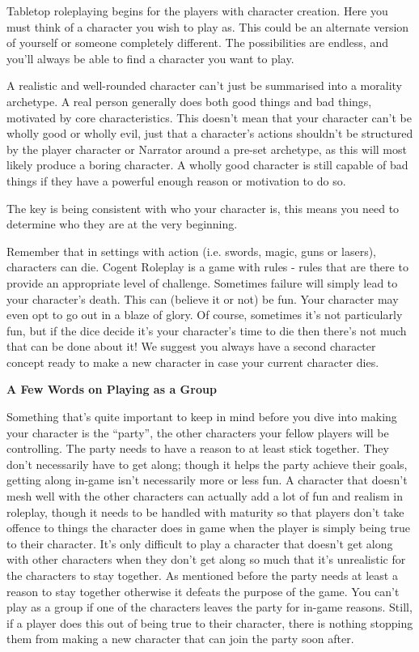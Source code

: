 Tabletop roleplaying begins for the players with character creation. Here you must think of a character you wish to play as. This could be an alternate version of yourself or someone completely different. The possibilities are endless, and you'll always be able to find a character you want to play.

A realistic and well-rounded character can't just be summarised into a morality archetype. A real person generally does both good things and bad things, motivated by core characteristics. This doesn't mean that your character can't be wholly good or wholly evil, just that a character's actions shouldn't be structured by the player character or Narrator around a pre-set archetype, as this will most likely produce a boring character. A wholly good character is still capable of bad things if they have a powerful enough reason or motivation to do so.

The key is being consistent with who your character is, this means you need to determine who they are at the very beginning.

Remember that in settings with action (i.e. swords, magic, guns or lasers), characters can die. Cogent Roleplay is a game with rules - rules that are there to provide an appropriate level of challenge. Sometimes failure will simply lead to your character's death. This can (believe it or not) be fun. Your character may even opt to go out in a blaze of glory. Of course, sometimes it's not particularly fun, but if the dice decide it's your character's time to die then there's not much that can be done about it! We suggest you always have a second character concept ready to make a new character in case your current character dies.

\begin{displayquote}
\textbf{A Few Words on Playing as a Group}

Something that's quite important to keep in mind before you dive into making your character is the \enquote{party}, the other characters your fellow players will be controlling. The party needs to have a reason to at least stick together. They don't necessarily have to get along; though it helps the party achieve their goals, getting along in-game isn't necessarily more or less fun. 
A character that doesn't mesh well with the other characters can actually add a lot of fun and realism in roleplay, though it needs to be handled with maturity so that players don't take offence to things the character does in game when the player is simply being true to their character. It's only difficult to play a character that doesn't get along with other characters when they don't get along so much that it's unrealistic for the characters to stay together. As mentioned before the party needs at least a reason to stay together otherwise it defeats the purpose of the game. You can't play as a group if one of the characters leaves the party for in-game reasons. Still, if a player does this out of being true to their character, there is nothing stopping them from making a new character that can join the party soon after.
\end{displayquote}

